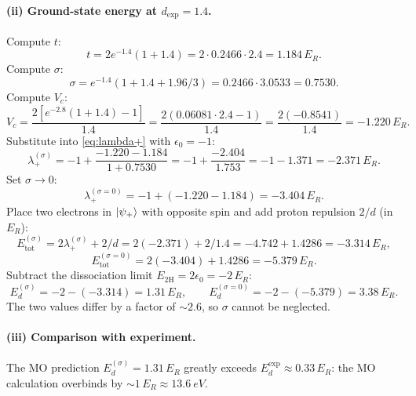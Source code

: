 \documentclass[11pt]{article}
\begin{document}
\paragraph{(ii) Ground-state energy at $d_{\mathrm{exp}}=1.4$.} Compute $t$:
\begin{equation}
t=2e^{-1.4}(1+1.4)=2\cdot 0.2466\cdot 2.4=1.184\,E_R.
\end{equation}
Compute $\sigma$:
\begin{equation}
\sigma=e^{-1.4}(1+1.4+1.96/3)=0.2466\cdot 3.0533=0.7530.
\end{equation}
Compute $V_c$:
\begin{equation}
V_c=\frac{2[e^{-2.8}(1+1.4)-1]}{1.4}=\frac{2(0.06081\cdot 2.4-1)}{1.4}=\frac{2(-0.8541)}{1.4}=-1.220\,E_R.
\end{equation}
Substitute into \eqref{eq:lambda+} with $\epsilon_0=-1$:
\begin{equation}
\lambda_+^{(\sigma)}=-1+\frac{-1.220-1.184}{1+0.7530}=-1+\frac{-2.404}{1.753}=-1-1.371=-2.371\,E_R.
\label{eq:lp-sigma}
\end{equation}
Set $\sigma\to 0$:
\begin{equation}
\lambda_+^{(\sigma=0)}=-1+(-1.220-1.184)=-3.404\,E_R.
\label{eq:lp-nosigma}
\end{equation}
Place two electrons in $\ket{\psi_+}$ with opposite spin and add proton repulsion $2/d$ (in $E_R$):
\begin{equation}
E_{\mathrm{tot}}^{(\sigma)}=2\lambda_+^{(\sigma)}+2/d=2(-2.371)+2/1.4=-4.742+1.4286=-3.314\,E_R,
\end{equation}
\begin{equation}
E_{\mathrm{tot}}^{(\sigma=0)}=2(-3.404)+1.4286=-5.379\,E_R.
\end{equation}
Subtract the dissociation limit $E_{2\mathrm H}=2\epsilon_0=-2\,E_R$:
\begin{equation}
E_d^{(\sigma)}=-2-(-3.314)=1.31\,E_R,\qquad E_d^{(\sigma=0)}=-2-(-5.379)=3.38\,E_R.
\end{equation}
The two values differ by a factor of $\sim 2.6$, so $\sigma$ cannot be neglected.

\paragraph{(iii) Comparison with experiment.} The MO prediction $E_d^{(\sigma)}=1.31\,E_R$ greatly exceeds $E_d^{\mathrm{exp}}\approx 0.33\,E_R$: the MO calculation overbinds by $\sim 1\,E_R\approx \SI{13.6}{eV}$.
\end{document}
